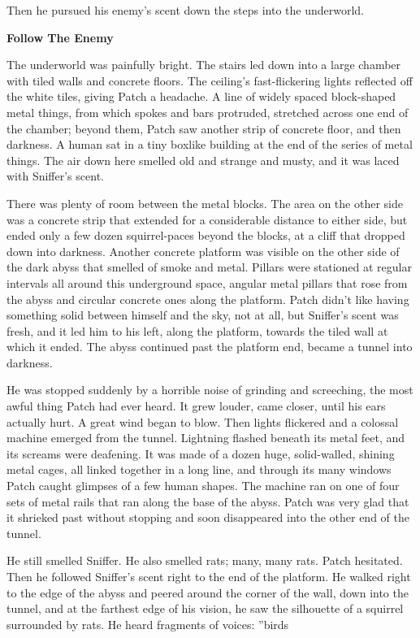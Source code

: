 \documentclass[11pt]{article}
\begin{document}
Then he pursued his enemy's scent down the steps into the underworld.\par
\par
{\bf Follow The Enemy\par
}\par
 The underworld was painfully bright. The stairs led down into a large chamber with tiled walls and concrete floors. The ceiling's fast-flickering lights reflected off the white tiles, giving Patch a headache. A line of widely spaced block-shaped metal things, from which spokes and bars protruded, stretched across one end of the chamber; beyond them, Patch saw another strip of concrete floor, and then darkness. A human sat in a tiny boxlike building at the end of the series of metal things. The air down here smelled old and strange and musty, and it was laced with Sniffer's scent.\par
 There was plenty of room between the metal blocks. The area on the other side was a concrete strip that extended for a considerable distance to either side, but ended only a few dozen squirrel-paces beyond the blocks, at a cliff that dropped down into darkness. Another concrete platform was visible on the other side of the dark abyss that smelled of smoke and metal. Pillars were stationed at regular intervals all around this underground space, angular metal pillars that rose from the abyss and circular concrete ones along the platform. Patch didn't like having something solid between himself and the sky, not at all, but Sniffer's scent was fresh, and it led him to his left, along the platform, towards the tiled wall at which it ended. The abyss continued past the platform end, became a tunnel into darkness.\par
 He was stopped suddenly by a horrible noise of grinding and screeching, the most awful thing Patch had ever heard. It grew louder, came closer, until his ears actually hurt. A great wind began to blow. Then lights flickered and a colossal machine emerged from the tunnel. Lightning flashed beneath its metal feet, and its screams were deafening. It was made of a dozen huge, solid-walled, shining metal cages, all linked together in a long line, and through its many windows Patch caught glimpses of a few human shapes. The machine ran on one of four sets of metal rails that ran along the base of the abyss. Patch was very glad that it shrieked past without stopping and soon disappeared into the other end of the tunnel.\par
 He still smelled Sniffer. He also smelled rats; many, many rats. Patch hesitated. Then he followed Sniffer's scent right to the end of the platform. He walked right to the edge of the abyss and peered around the corner of the wall, down into the tunnel, and at the farthest edge of his vision, he saw the silhouette of a squirrel surrounded by rats. He heard fragments of voices: ''birds%
\end{document}
